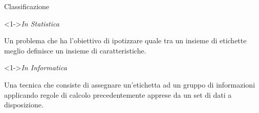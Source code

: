 \begin{tframe}{Classificazione}

    \begin{block}<1->{\textit{In Statistica}}
        
        
        Un problema che ha l'obiettivo di ipotizzare 
        quale tra un insieme di etichette meglio definisce un insieme di caratteristiche.
        
        
    \end{block}

    \begin{block}<1->{\textit{In Informatica}}
        
        Una tecnica che consiste di assegnare un'etichetta ad un gruppo di informazioni applicando
        regole di calcolo precedentemente apprese da un set di dati a disposizione.

    \end{block}

        


\end{tframe}
